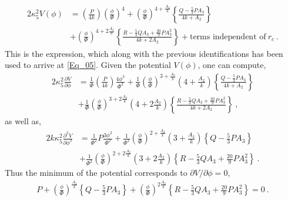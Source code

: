 \documentclass{article}
\begin{document}
\begin{align}
2\kappa _{5}^{2}V(\phi)&=\left(\frac{P}{4k}\right)\left(\frac{\phi}{\Phi}\right)^{4}+\left(\frac{\phi}{\Phi}\right)^{4+\frac{A_{2}}{k}}\left\lbrace \frac{Q-\frac{5}{3}PA_{3}}{4k+A_{2}} \right\rbrace
\nonumber
\\
&+\left(\frac{\phi}{\Phi}\right)^{4+2\frac{A_{2}}{k}}\left\lbrace \frac{R-\frac{5}{3}QA_{3}+\frac{20}{9}PA_{3}^{2}}{4k+2A_{2}}\right\rbrace +\textrm{terms independent of}~r_{c}~.
\end{align}
This is the expression, which along with the previous identifications has been used to arrive at \ref{Eq_05}. Given the potential $V(\phi)$, one can compute,
\begin{align}
2\kappa _{5}^{2}\frac{\partial V}{\partial \phi}&=\frac{1}{\Phi}\left(\frac{P}{4k}\right)\frac{4\phi ^{3}}{\Phi^{3}}
+\frac{1}{\Phi}\left(\frac{\phi}{\Phi}\right)^{3+\frac{A_{2}}{k}}\left(4+\frac{A_{2}}{k}\right)\left\lbrace \frac{Q-\frac{5}{3}PA_{3}}{4k+A_{2}} \right\rbrace
\nonumber
\\
&+\frac{1}{\Phi}\left(\frac{\phi}{\Phi}\right)^{3+2\frac{A_{2}}{k}}\left(4+2\frac{A_{2}}{k}\right)\left\lbrace \frac{R-\frac{5}{3}QA_{3}+\frac{20}{9}PA_{3}^{2}}{4k+2A_{2}}\right\rbrace ~,
\end{align}
as well as,
\begin{align}
2k\kappa _{5}^{2}\frac{\partial ^{2}V}{\partial \phi ^{2}}&=\frac{1}{\Phi^{2}}P\frac{3\phi ^{2}}{\Phi^{2}}
+\frac{1}{\Phi^{2}}\left(\frac{\phi}{\Phi}\right)^{2+\frac{A_{2}}{k}}\left(3+\frac{A_{2}}{k}\right)\left\lbrace Q-\frac{5}{3}PA_{3} \right\rbrace
\nonumber
\\
&+\frac{1}{\Phi^{2}}\left(\frac{\phi}{\Phi}\right)^{2+2\frac{A_{2}}{k}}\left(3+2\frac{A_{2}}{k}\right)\left\lbrace R-\frac{5}{3}QA_{3}+\frac{20}{9}PA_{3}^{2}\right\rbrace ~.
\end{align}
Thus the minimum of the potential corresponds to $\partial V/\partial \phi=0$, 
\begin{align}
P+\left(\frac{\phi}{\Phi}\right)^{\frac{A_{2}}{k}}\left\lbrace Q-\frac{5}{3}PA_{3} \right\rbrace+\left(\frac{\phi}{\Phi}\right)^{2\frac{A_{2}}{k}}\left\lbrace R-\frac{5}{3}QA_{3}+\frac{20}{9}PA_{3}^{2}\right\rbrace=0~.
\end{align}
\end{document}
